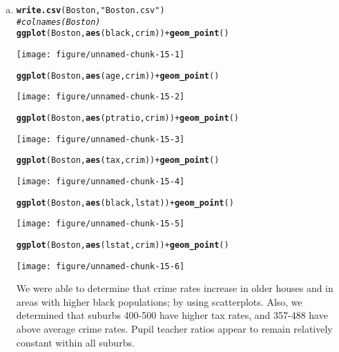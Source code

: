 \documentclass{article}\usepackage[]{graphicx}\usepackage[]{color}
\makeatletter
\def\maxwidth{ %
  \ifdim\Gin@nat@width>\linewidth
    \linewidth
  \else
    \Gin@nat@width
  \fi
}
\newcommand{\hlstr}[1]{\textcolor[rgb]{0.192,0.494,0.8}{#1}}%
\newcommand{\hlcom}[1]{\textcolor[rgb]{0.678,0.584,0.686}{\textit{#1}}}%
\newcommand{\hlopt}[1]{\textcolor[rgb]{0,0,0}{#1}}%
\newcommand{\hlstd}[1]{\textcolor[rgb]{0.345,0.345,0.345}{#1}}%
\newcommand{\hlkwd}[1]{\textcolor[rgb]{0.737,0.353,0.396}{\textbf{#1}}}%
\newenvironment{kframe}{%
 \def\at@end@of@kframe{}%
 \ifinner\ifhmode%
  \def\at@end@of@kframe{\end{minipage}}%
  \begin{minipage}{\columnwidth}%
 \fi\fi%
 \def\FrameCommand##1{\hskip\@totalleftmargin \hskip-\fboxsep
 \colorbox{shadecolor}{##1}\hskip-\fboxsep
     \hskip-\linewidth \hskip-\@totalleftmargin \hskip\columnwidth}%
 \MakeFramed {\advance\hsize-\width
   \@totalleftmargin\z@ \linewidth\hsize
   \@setminipage}}%
 {\par\unskip\endMakeFramed%
 \at@end@of@kframe}
\newenvironment{knitrout}{}{} %
\makeatother
\begin{document}
\begin{enumerate}[(a)]
\item
\begin{knitrout}
\color{fgcolor}\begin{kframe}
\begin{alltt}
\hlkwd{write.csv}\hlstd{(Boston,} \hlstr{"Boston.csv"}\hlstd{)}
\hlcom{# colnames(Boston)}
\hlkwd{ggplot}\hlstd{(Boston,} \hlkwd{aes}\hlstd{(black,crim))}\hlopt{+}\hlkwd{geom_point}\hlstd{()}
\end{alltt}
\end{kframe}
\texttt{[image: figure/unnamed-chunk-15-1]} 
\begin{kframe}\begin{alltt}
\hlkwd{ggplot}\hlstd{(Boston,} \hlkwd{aes}\hlstd{(age,crim))}\hlopt{+}\hlkwd{geom_point}\hlstd{()}
\end{alltt}
\end{kframe}
\texttt{[image: figure/unnamed-chunk-15-2]} 
\begin{kframe}\begin{alltt}
\hlkwd{ggplot}\hlstd{(Boston,} \hlkwd{aes}\hlstd{(ptratio,crim))}\hlopt{+}\hlkwd{geom_point}\hlstd{()}
\end{alltt}
\end{kframe}
\texttt{[image: figure/unnamed-chunk-15-3]} 
\begin{kframe}\begin{alltt}
\hlkwd{ggplot}\hlstd{(Boston,} \hlkwd{aes}\hlstd{(tax,crim))}\hlopt{+}\hlkwd{geom_point}\hlstd{()}
\end{alltt}
\end{kframe}
\texttt{[image: figure/unnamed-chunk-15-4]} 
\begin{kframe}\begin{alltt}
\hlkwd{ggplot}\hlstd{(Boston,} \hlkwd{aes}\hlstd{(black,lstat))}\hlopt{+}\hlkwd{geom_point}\hlstd{()}
\end{alltt}
\end{kframe}
\texttt{[image: figure/unnamed-chunk-15-5]} 
\begin{kframe}\begin{alltt}
\hlkwd{ggplot}\hlstd{(Boston,} \hlkwd{aes}\hlstd{(lstat,crim))}\hlopt{+}\hlkwd{geom_point}\hlstd{()}
\end{alltt}
\end{kframe}
\texttt{[image: figure/unnamed-chunk-15-6]} 

\end{knitrout}
We were able to determine that crime rates increase in older houses and in areas with higher black populations; by using scatterplots. Also, we determined that suburbs 400-500 have higher tax rates, and 357-488 have above average crime rates. Pupil teacher ratios appear to remain relatively constant within all suburbs. \\


\end{enumerate}
\end{document}
